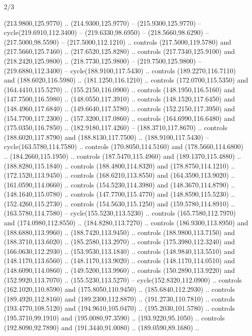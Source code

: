 \begin{flagdescription}{2/3}
\begin{scope}[xshift=0.5\flaglength,yshift=0.5\flagwidth,scale=\stretchfactor]
\begin{scope}[scale=0.001645\flagwidth,yshift=65mm,xshift=-63mm]
\begin{scope}[y=0.80pt, x=0.80pt, yscale=-1,]
\begin{scope}[cm={{1.33333,0.0,0.0,1.33333,(0.0,1e-05)}}]
  (213.9800,125.9770) .. (214.9300,125.9770) -- (215.9300,125.9770) --
  cycle(219.6910,112.3400) -- (219.6330,98.6950) -- (218.5660,98.6290) --
  (217.5000,98.5590) -- (217.5000,112.1210) .. controls (217.5000,119.5780) and
  (217.5660,125.7460) .. (217.6520,125.8280) .. controls (217.7340,125.9100) and
  (218.2420,125.9800) .. (218.7730,125.9800) -- (219.7500,125.9800) --
  (219.6880,112.3400) -- cycle(188.9100,117.5430) .. controls
  (189.2270,116.7110) and (188.6020,116.5980) .. (181.1250,116.1210) .. controls
  (172.0700,115.5350) and (164.4410,115.5270) .. (155.2150,116.0900) .. controls
  (148.1950,116.5160) and (147.7500,116.5980) .. (148.0550,117.3910) .. controls
  (148.1520,117.6450) and (148.4960,117.6840) .. (149.6640,117.5780) .. controls
  (152.2150,117.3950) and (154.7700,117.2300) .. (157.3200,117.0860) .. controls
  (164.6990,116.6480) and (175.0350,116.7850) .. (182.9180,117.4260) --
  (188.3710,117.8670) .. controls (188.6020,117.8790) and (188.8130,117.7500) ..
  (188.9100,117.5430) -- cycle(163.5780,114.7580) .. controls
  (170.8050,114.5160) and (178.5660,114.6800) .. (184.2660,115.1950) .. controls
  (187.5470,115.4960) and (189.1370,115.4880) .. (188.8280,115.1840) .. controls
  (188.4800,114.8320) and (178.8750,114.1210) .. (172.1520,113.9450) .. controls
  (168.6210,113.8550) and (164.3590,113.9020) .. (161.0590,114.0660) .. controls
  (154.5230,114.3980) and (148.3670,114.8790) .. (148.1640,115.0780) .. controls
  (147.7700,115.4770) and (148.8590,115.5230) .. (152.4260,115.2730) .. controls
  (154.5630,115.1250) and (159.5780,114.8910) .. (163.5780,114.7580) --
  cycle(155.5230,113.5230) .. controls (165.7580,112.7970) and
  (174.0980,112.8550) .. (184.8280,113.7270) .. controls (186.9300,113.8950) and
  (188.6880,113.9960) .. (188.7420,113.9450) .. controls (188.9800,113.7150) and
  (188.3710,113.6020) .. (185.2580,113.2970) .. controls (175.3980,112.3240) and
  (166.0630,112.2930) .. (153.9530,113.1840) .. controls (148.9840,113.5510) and
  (148.1170,113.6560) .. (148.1170,113.9020) .. controls (148.1170,114.0510) and
  (148.6090,114.0860) .. (149.5200,113.9960) .. controls (150.2890,113.9220) and
  (152.9920,113.7070) .. (155.5230,113.5270) -- cycle(152.8320,112.0900) ..
  controls (162.1020,110.8590) and (175.8050,110.9450) .. (185.6840,112.2930) ..
  controls (189.4920,112.8160) and (189.2300,112.8870) .. (191.2730,110.7810) ..
  controls (193.4770,108.5120) and (194.9610,105.0470) .. (195.2030,101.5780) ..
  controls (195.3710,99.1910) and (195.0080,97.3590) .. (193.9220,95.1050) ..
  controls (192.8090,92.7890) and (191.3440,91.0080) .. (189.0590,89.1680) ..

\end{scope}
\end{scope}
\end{scope}
\end{scope}
\end{flagdescription}
